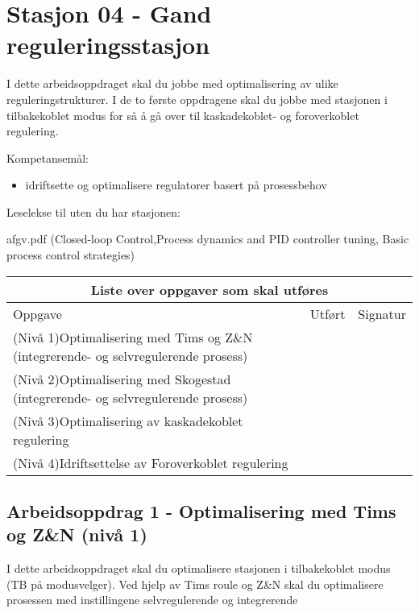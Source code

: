 
\noindent
\section*{Stasjon 04 - Gand reguleringsstasjon}

I dette arbeidsoppdraget skal du jobbe med optimalisering av ulike reguleringstrukturer. I de to første oppdragene skal du jobbe med stasjonen i tilbakekoblet modus for så å gå over til kaskadekoblet- og foroverkoblet regulering. 

\vskip 5pt
Kompetansemål:
\begin{itemize}[noitemsep]
	\item idriftsette og optimalisere regulatorer basert på prosessbehov
\end{itemize}




Leselekse til uten du har stasjonen:

afgv.pdf (Closed-loop Control,Process dynamics and PID controller tuning, Basic process control strategies)

\begin{center}
\begin{tabular}{ | m{10cm} | m{1cm}| m{2cm} | } 
\hline
\multicolumn{3}{|c|}{Liste over oppgaver som skal utføres} \\
	\hline
	Oppgave	& Utført & Signatur \\ 
	\hline
	\hline
	\cellcolor{green!60}(Nivå 1)Optimalisering med Tims og Z\&N (integrerende- og selvregulerende prosess)	& & \\ 
	\hline
	\cellcolor{yellow!60}(Nivå 2)Optimalisering med Skogestad (integrerende- og selvregulerende prosess)	& & \\ 
	\hline
	\cellcolor{orange!60}(Nivå 3)Optimalisering av kaskadekoblet regulering	& & \\ 
	\hline
	\cellcolor{red!60}(Nivå 4)Idriftsettelse av Foroverkoblet regulering	& & \\ 
	\hline
\end{tabular}
\end{center}
\newpage
\subsection*{Arbeidsoppdrag 1 - Optimalisering med Tims og Z\&N (nivå 1)}

I dette arbeidsoppdraget skal du optimalisere stasjonen i tilbakekoblet modus (TB på modusvelger). Ved hjelp av Tims roule og Z\&N skal du optimalisere prosessen med instillingene selvregulerende og integrerende

